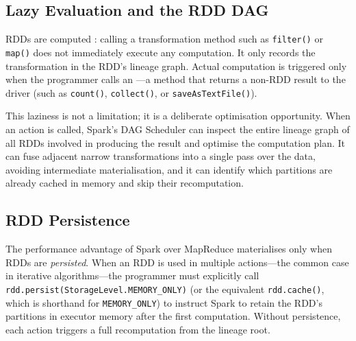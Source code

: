 \subsection{Lazy Evaluation and the RDD DAG}
\label{subsec:lazy}

RDDs are computed : calling a transformation method such as
\texttt{filter()} or \texttt{map()} does not immediately execute any
computation. It only records the transformation in the RDD's lineage
graph. Actual computation is triggered only when the programmer calls
an ---a method that returns a non-RDD result to the driver
(such as \texttt{count()}, \texttt{collect()}, or \texttt{saveAsTextFile()}).

This laziness is not a limitation; it is a deliberate optimisation
opportunity. When an action is called, Spark's DAG Scheduler can inspect
the entire lineage graph of all RDDs involved in producing the result
and optimise the computation plan. It can fuse adjacent narrow
transformations into a single pass over the data, avoiding intermediate
materialisation, and it can identify which partitions are already cached
in memory and skip their recomputation.

\subsection{RDD Persistence}
\label{subsec:persistence}

The performance advantage of Spark over MapReduce materialises only when
RDDs are \emph{persisted}. When an RDD is used in multiple actions---the
common case in iterative algorithms---the programmer must explicitly call
\texttt{rdd.persist(StorageLevel.MEMORY\_ONLY)} (or the equivalent
\texttt{rdd.cache()}, which is shorthand for
\texttt{MEMORY\_ONLY}) to instruct Spark to retain the RDD's partitions
in executor memory after the first computation. Without persistence,
each action triggers a full recomputation from the lineage root.

